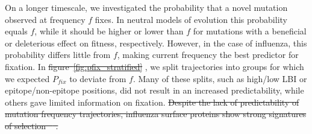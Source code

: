 \documentclass[reprint,amsmath,amssymb,superscriptaddress,showpacs,rmp]{revtex4-1}
\newcommand{\sref}[1]{S\ref{#1}}
\providecommand{\DIFadd}[1]{{\protect\color{blue}\uwave{#1}}} %
\providecommand{\DIFdel}[1]{{\protect\color{red}\sout{#1}}}                      %
\providecommand{\DIFaddbegin}{} %
\providecommand{\DIFaddend}{} %
\providecommand{\DIFdelbegin}{} %
\providecommand{\DIFdelend}{} %
\newcommand{\DIFscaledelfig}{0.5}
\newlength{\DIFdelgraphicswidth} %
\newlength{\DIFdelgraphicsheight} %
\newcommand{\DIFaddincludegraphics}[2][]{{\color{blue}\fbox{\DIFOincludegraphics[#1]{#2}}}} %
\newcommand{\DIFdelincludegraphics}[2][]{%
\sbox{\DIFdelgraphicsbox}{\DIFOincludegraphics[#1]{#2}}%
\settoboxwidth{\DIFdelgraphicswidth}{\DIFdelgraphicsbox} %
\settoboxtotalheight{\DIFdelgraphicsheight}{\DIFdelgraphicsbox} %
\scalebox{\DIFscaledelfig}{%
\parbox[b]{\DIFdelgraphicswidth}{\usebox{\DIFdelgraphicsbox}\\[-\baselineskip] \rule{\DIFdelgraphicswidth}{0em}}\llap{\resizebox{\DIFdelgraphicswidth}{\DIFdelgraphicsheight}{%
\setlength{\unitlength}{\DIFdelgraphicswidth}%
\begin{picture}(1,1)%
\thicklines\linethickness{2pt} %
{\color[rgb]{1,0,0}\put(0,0){\framebox(1,1){}}}%
{\color[rgb]{1,0,0}\put(0,0){\line( 1,1){1}}}%
{\color[rgb]{1,0,0}\put(0,1){\line(1,-1){1}}}%
\end{picture}%
}\hspace*{3pt}}} %
} %
\DeclareRobustCommand{\DIFaddbegin}{\DIFOaddbegin \let\includegraphics\DIFaddincludegraphics} %
\DeclareRobustCommand{\DIFaddend}{\DIFOaddend \let\includegraphics\DIFOincludegraphics} %
\DeclareRobustCommand{\DIFdelbegin}{\DIFOdelbegin \let\includegraphics\DIFdelincludegraphics} %
\DeclareRobustCommand{\DIFdelend}{\DIFOaddend \let\includegraphics\DIFOincludegraphics} %
\begin{document}
On a longer timescale, we investigated the probability that a novel mutation observed at frequency $f$ fixes.
In neutral models of evolution this probability equals $f$, while it should be higher or lower than $f$ for mutations with a beneficial or deleterious effect on fitness, respectively.
However, in the case of influenza, this probability differs little from $f$, making current frequency the best predictor for fixation.
In \DIFdelbegin \DIFdel{figure~\ref{fig:pfix_stratified} }\DIFdelend \DIFaddbegin \DIFadd{figures~\ref{fig:pfix_stratified} and~\sref{fig:pfix_v_freq_indivjohnsmodels}}\DIFaddend , we split trajectories into groups for which we expected $P_{fix}$ to deviate from $f$.
Many of these splits, such as high/low LBI or epitope/non-epitope positions, did not result in an increased predictability, while others gave limited information on fixation.
\DIFdelbegin \DIFdel{Despite the lack of predictability of mutation frequency trajectories, influenza surface proteins show strong signatures of selection \mbox{%
\citep{bhatt_genomic_2011,strelkowa_clonal_2012}}\hspace{0pt}%
.
}\DIFdelend 

\end{document}
